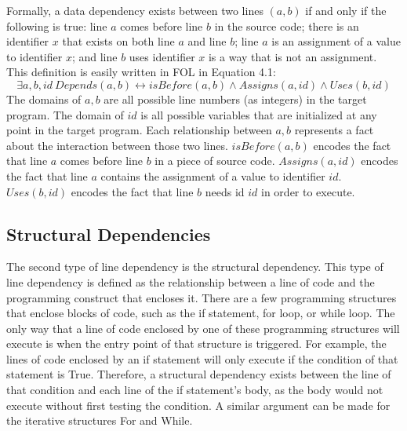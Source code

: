 Formally, a data dependency exists between two lines $(a,b)$ if and only if the following is true: line $a$ comes before line $b$ in the source code; there is an identifier $x$ that exists on both line $a$ and line $b$; line $a$ is an assignment of a value to identifier $x$; and line $b$ uses identifier $x$ is a way that is not an assignment. This definition is easily written in FOL in Equation 4.1:
\begin{equation}
\exists a,b,id \ Depends(a,b) \leftrightarrow isBefore(a,b) \land Assigns(a, id) \land Uses(b, id)
\end{equation}
The domains of $a,b$ are all possible line numbers (as integers) in the target program. The domain of $id$ is all possible variables that are initialized at any point in the target program. Each relationship between $a,b$ represents a fact about the interaction between those two lines. $isBefore(a, b)$ encodes the fact that line $a$ comes before line $b$ in a piece of source code. $Assigns(a, id)$ encodes the fact that line $a$ contains the assignment of a value to identifier $id$. $Uses(b, id)$ encodes the fact that line $b$ needs id $id$ in order to execute.

\subsection{Structural Dependencies}

The second type of line dependency is the structural dependency. This type of line dependency is defined as the relationship between a line of code and the programming construct that encloses it. There are a few programming structures that enclose blocks of code, such as the if statement, for loop, or while loop. The only way that a line of code enclosed by one of these programming structures will execute is when the entry point of that structure is triggered. For example, the lines of code enclosed by an if statement will only execute if the condition of that statement is True. Therefore, a structural dependency exists between the line of that condition and each line of the if statement's body, as the body would not execute without first testing the condition. A similar argument can be made for the iterative structures For and While.



